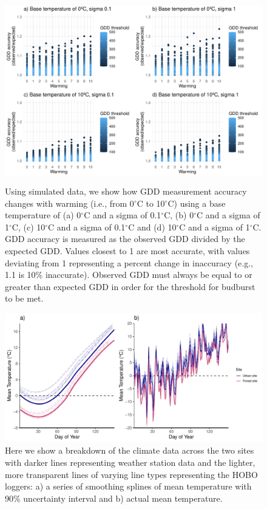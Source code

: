 \documentclass{article}\usepackage[]{graphicx}\usepackage[]{color}
\begin{document}
\begin{figure}[H]
    \centering
    \includegraphics[height=8cm, width=12cm]{..//analyses/figures/gddratio_warming.pdf}
\caption{Using simulated data, we show how GDD measurement accuracy changes with warming (i.e., from 0$^{\circ}$C to 10$^{\circ}$C) using a base temperature of (a) 0$^{\circ}$C and a sigma of 0.1$^{\circ}$C, (b) 0$^{\circ}$C and a sigma of 1$^{\circ}$C, (c) 10$^{\circ}$C and a sigma of 0.1$^{\circ}$C and (d) 10$^{\circ}$C and a sigma of 1$^{\circ}$C. GDD accuracy is measured as the observed GDD divided by the expected GDD. Values closest to 1 are most accurate, with values deviating from 1 representing a percent change in inaccuracy (e.g., 1.1 is 10\% inaccurate). Observed GDD must always be equal to or greater than expected GDD in order for the threshold for budburst to be met.}
\label{fig:warming}
\end{figure}


{\begin{figure} [H]
  \begin{center}
  \includegraphics[width=12cm]{..//analyses/figures/climate_smoothdaily.pdf}
  \caption{Here we show a breakdown of the climate data across the two sites with darker lines representing weather station data and the lighter, more transparent lines of varying line types representing the HOBO loggers: a) a series of smoothing splines of mean temperature with 90\% uncertainty interval and b) actual mean temperature.}\label{fig:clim}
  \end{center}
  \end{figure}}
  
\end{document}
